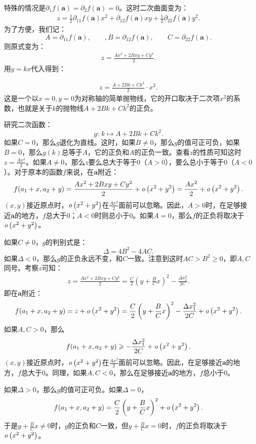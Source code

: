 \documentclass[12pt,UTF8,fontset=none]{ctexbook}
\begin{document}
特殊的情况是$\partial_1 f(\mathbf{a}) = \partial_2 f(\mathbf{a}) = 0$。这时二次曲面变为：
\begin{align*}
    z = \frac{1}{2} \partial_{11} f(\mathbf{a})x^2 + \partial_{12} f(\mathbf{a})xy + \frac{1}{2}\partial_{22} f(\mathbf{a})y^2.
\end{align*}
为了方便，我们记：
$$ A = \partial_{11} f(\mathbf{a}),\qquad , B = \partial_{12} f(\mathbf{a}), \qquad C = \partial_{22} f(\mathbf{a}). $$
则原式变为：
\begin{align*}
    z = \frac{Ax^2 + 2Bxy+Cy^2}{2}.
\end{align*}
用$y = kx$代入得到：

\begin{align*}
    z = \frac{A + 2Bk+Ck^2}{2}\cdot x^2.
\end{align*}
这是一个以$x=0,y=0$为对称轴的简单抛物线，它的开口取决于二次项$x^2$的系数，也就是关于$k$的抛物线$A + 2Bk+Ck^2$的正负。

研究二次函数：
$$ g: \, k \mapsto A + 2Bk+Ck^2.$$
如果$C = 0$，那么$g$退化为直线。这时，如果$B\neq 0$，那么$g$的值可正可负，如果$B=0$，那么$g(k)$总等于$A$，它的正负和$A$的正负一致。查看$z$的性质可知这时$z = \frac{Ax^2}{2}$。如果$A\neq 0$，那么$z$要么总大于等于$0$（$A>0$），要么总小于等于$0$（$A<0$）。对于原本的函数$f$来说，在$\mathbf{a}$附近：
$$ f(a_1+x,a_2+y) = \frac{Ax^2 + 2Bxy+Cy^2}{2} + \mathit{o}\left(x^2+y^2\right) = \frac{Ax^2}{2} + \mathit{o}\left(x^2+y^2\right). $$
$(x,y)$接近原点时，$\mathit{o}\left(x^2+y^2\right)$在$\frac{Ax^2}{2}$面前可以忽略。因此，$A>0$时，在足够接近$\mathbf{a}$的地方，$f$总大于$0$；$A<0$时则总小于$0$。如果$A=0$，那么$f$的正负将取决于$\mathit{o}\left(x^2+y^2\right)$。

如果$C\neq 0$，$g$的判别式是：
$$ \Delta = 4B^2 - 4AC.$$
如果$\Delta < 0$，那么$g$的正负永远不变，和$C$一致。注意到这时$AC>B^2\geqslant 0$，即$A,C$同号。考察$z$可知：
\begin{align*}
    z = \frac{Ax^2 + 2Bxy+Cy^2}{2} = \frac{C}{2}\left(y + \frac{B}{C}x\right)^2 - \frac{\Delta x_1^2}{2C}.
\end{align*}
即在$\mathbf{a}$附近：
$$ f(a_1+x,a_2+y) = z + \mathit{o}\left(x^2+y^2\right) = \frac{C}{2}\left(y + \frac{B}{C}x\right)^2 - \frac{\Delta x_1^2}{2C} + \mathit{o}\left(x^2+y^2\right). $$
如果$A,C>0$，那么
$$ f(a_1+x,a_2+y) \geqslant - \frac{\Delta x_1^2}{2C} + \mathit{o}\left(x^2+y^2\right). $$
$(x,y)$接近原点时，$\mathit{o}\left(x^2+y^2\right)$在$\frac{Ax^2}{2}$面前可以忽略。因此，在足够接近$\mathbf{a}$的地方，$f$总大于$0$。同理，如果$A,C<0$，那么在足够接近$\mathbf{a}$的地方，$f$总小于$0$。

如果$\Delta > 0$，那么$g$的值可正可负。如果$\Delta=0$，
$$ f(a_1+x,a_2+y) = \frac{C}{2}\left(y + \frac{B}{C}x\right)^2 + \mathit{o}\left(x^2+y^2\right). $$
于是$y + \frac{B}{C}x \neq 0$时，$g$的正负和$C$一致，但$y + \frac{B}{C}x = 0$时，$f$的正负将取决于$\mathit{o}\left(x^2+y^2\right)$。
\end{document}
